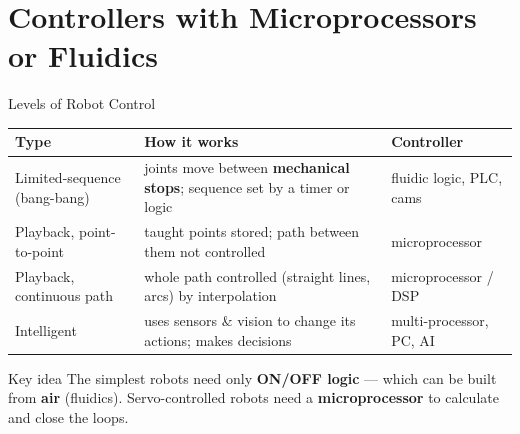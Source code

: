 \documentclass[aspectratio=169]{beamer}
\begin{document}
	\section{Controllers with Microprocessors or Fluidics}
	\begin{frame}{Levels of Robot Control}
		\renewcommand{\arraystretch}{1.1}
		\centering
		\footnotesize
		\begin{tabular}{@{}>{\raggedright}p{3.4cm}>{\raggedright}p{5.6cm}>{\raggedright\arraybackslash}p{3.6cm}@{}}
			\toprule
			\textbf{Type} & \textbf{How it works} & \textbf{Controller} \\
			\midrule
			Limited-sequence (bang-bang) & joints move between \textbf{mechanical stops}; sequence set by a timer or logic & fluidic logic, PLC, cams \\
			Playback, point-to-point     & taught points stored; path between them not controlled & microprocessor \\
			Playback, continuous path    & whole path controlled (straight lines, arcs) by interpolation & microprocessor / DSP \\
			Intelligent                  & uses sensors \& vision to change its actions; makes decisions & multi-processor, PC, AI \\
			\bottomrule
		\end{tabular}
		\vspace{0.15cm}
		\begin{block}{Key idea}
			\small The simplest robots need only \textbf{ON/OFF logic} --- which can be built from \textbf{air} (fluidics). Servo-controlled robots need a \textbf{microprocessor} to calculate and close the loops.
		\end{block}
	\end{frame}
\end{document}
